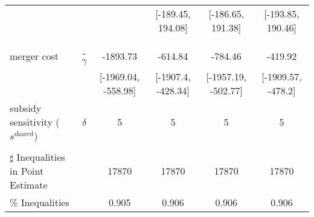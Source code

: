 \begin{tabular}{@{\extracolsep{5pt}}lccccc}
 &  &  & [-189.45, 194.08] & [-186.65, 191.38] & [-193.85, 190.46] \\
 &  &  &  &  &  \\
 &  &  &  &  &  \\
merger cost & -$\gamma$ & -1893.73 & -614.84 & -784.46 & -419.92 \\
 &  & [-1969.04, -558.98] & [-1907.4, -428.34] & [-1957.19, -502.77] & [-1909.57, -478.2] \\
subsidy sensitivity ($s^{\text{shared}}$) & $\delta$ & 5 & 5 & 5 & 5 \\
 &  &  &  &  &  \\
\hline 
$\sharp$ Inequalities in Point Estimate &  & 17870 & 17870 & 17870 & 17870 \\
\% Inequalities &  & 0.905 & 0.906 & 0.906 & 0.906 \\
\bottomrule 
\end{tabular}
